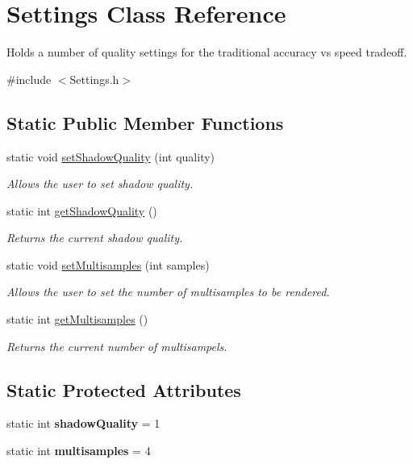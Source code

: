 \hypertarget{class_settings}{\section{Settings Class Reference}
\label{class_settings}
}


Holds a number of quality settings for the traditional accuracy vs speed tradeoff.  




{\ttfamily \#include $<$Settings.\-h$>$}

\subsection*{Static Public Member Functions}
\begin{DoxyCompactItemize}
\item 
static void \hyperlink{class_settings_a68abf3112059e840eb7f6f260f016f00}{set\-Shadow\-Quality} (int quality)
\begin{DoxyCompactList}\small\item\em Allows the user to set shadow quality. \end{DoxyCompactList}\item 
static int \hyperlink{class_settings_ae23d0bd93caaf3fecb968991379836ba}{get\-Shadow\-Quality} ()
\begin{DoxyCompactList}\small\item\em Returns the current shadow quality. \end{DoxyCompactList}\item 
static void \hyperlink{class_settings_a3d9a2ef3a0bdd775c7740f14d328e354}{set\-Multisamples} (int samples)
\begin{DoxyCompactList}\small\item\em Allows the user to set the number of multisamples to be rendered. \end{DoxyCompactList}\item 
static int \hyperlink{class_settings_a25c0848d77676fcb8ad515d174fb8acc}{get\-Multisamples} ()
\begin{DoxyCompactList}\small\item\em Returns the current number of multisampels. \end{DoxyCompactList}\end{DoxyCompactItemize}
\subsection*{Static Protected Attributes}
\begin{DoxyCompactItemize}
\item 
\hypertarget{class_settings_ab6ac3c9e85e7e97f134405239e81c474}{static int {\bfseries shadow\-Quality} = 1}\label{class_settings_ab6ac3c9e85e7e97f134405239e81c474}

\item 
\hypertarget{class_settings_ae7d696033379bbf723d606969e288bf7}{static int {\bfseries multisamples} = 4}\label{class_settings_ae7d696033379bbf723d606969e288bf7}

\end{DoxyCompactItemize}


